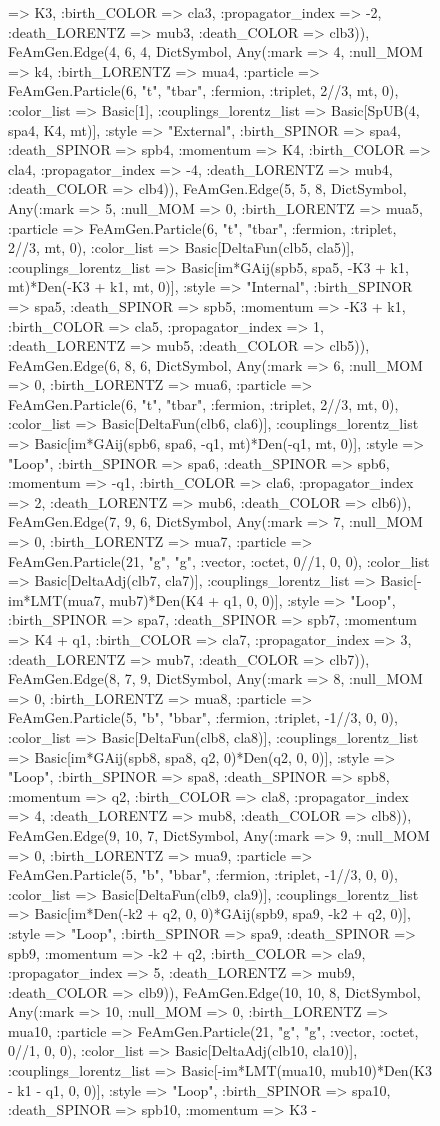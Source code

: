 \documentclass{revtex4}
\begin{document}
\begin{figure}[!htb]
\begin{center}
{=> K3, :birth_COLOR => cla3, :propagator_index => -2, :death_LORENTZ => mub3, :death_COLOR => clb3)), FeAmGen.Edge(4, 6, 4, Dict{Symbol, Any}(:mark => 4, :null_MOM => k4, :birth_LORENTZ => mua4, :particle => FeAmGen.Particle(6, "t", "tbar", :fermion, :triplet, 2//3, mt, 0), :color_list => Basic[1], :couplings_lorentz_list => Basic[SpUB(4, spa4, K4, mt)], :style => "External", :birth_SPINOR => spa4, :death_SPINOR => spb4, :momentum => K4, :birth_COLOR => cla4, :propagator_index => -4, :death_LORENTZ => mub4, :death_COLOR => clb4)), FeAmGen.Edge(5, 5, 8, Dict{Symbol, Any}(:mark => 5, :null_MOM => 0, :birth_LORENTZ => mua5, :particle => FeAmGen.Particle(6, "t", "tbar", :fermion, :triplet, 2//3, mt, 0), :color_list => Basic[DeltaFun(clb5, cla5)], :couplings_lorentz_list => Basic[im*GAij(spb5, spa5, -K3 + k1, mt)*Den(-K3 + k1, mt, 0)], :style => "Internal", :birth_SPINOR => spa5, :death_SPINOR => spb5, :momentum => -K3 + k1, :birth_COLOR => cla5, :propagator_index => 1, :death_LORENTZ => mub5, :death_COLOR => clb5)), FeAmGen.Edge(6, 8, 6, Dict{Symbol, Any}(:mark => 6, :null_MOM => 0, :birth_LORENTZ => mua6, :particle => FeAmGen.Particle(6, "t", "tbar", :fermion, :triplet, 2//3, mt, 0), :color_list => Basic[DeltaFun(clb6, cla6)], :couplings_lorentz_list => Basic[im*GAij(spb6, spa6, -q1, mt)*Den(-q1, mt, 0)], :style => "Loop", :birth_SPINOR => spa6, :death_SPINOR => spb6, :momentum => -q1, :birth_COLOR => cla6, :propagator_index => 2, :death_LORENTZ => mub6, :death_COLOR => clb6)), FeAmGen.Edge(7, 9, 6, Dict{Symbol, Any}(:mark => 7, :null_MOM => 0, :birth_LORENTZ => mua7, :particle => FeAmGen.Particle(21, "g", "g", :vector, :octet, 0//1, 0, 0), :color_list => Basic[DeltaAdj(clb7, cla7)], :couplings_lorentz_list => Basic[-im*LMT(mua7, mub7)*Den(K4 + q1, 0, 0)], :style => "Loop", :birth_SPINOR => spa7, :death_SPINOR => spb7, :momentum => K4 + q1, :birth_COLOR => cla7, :propagator_index => 3, :death_LORENTZ => mub7, :death_COLOR => clb7)), FeAmGen.Edge(8, 7, 9, Dict{Symbol, Any}(:mark => 8, :null_MOM => 0, :birth_LORENTZ => mua8, :particle => FeAmGen.Particle(5, "b", "bbar", :fermion, :triplet, -1//3, 0, 0), :color_list => Basic[DeltaFun(clb8, cla8)], :couplings_lorentz_list => Basic[im*GAij(spb8, spa8, q2, 0)*Den(q2, 0, 0)], :style => "Loop", :birth_SPINOR => spa8, :death_SPINOR => spb8, :momentum => q2, :birth_COLOR => cla8, :propagator_index => 4, :death_LORENTZ => mub8, :death_COLOR => clb8)), FeAmGen.Edge(9, 10, 7, Dict{Symbol, Any}(:mark => 9, :null_MOM => 0, :birth_LORENTZ => mua9, :particle => FeAmGen.Particle(5, "b", "bbar", :fermion, :triplet, -1//3, 0, 0), :color_list => Basic[DeltaFun(clb9, cla9)], :couplings_lorentz_list => Basic[im*Den(-k2 + q2, 0, 0)*GAij(spb9, spa9, -k2 + q2, 0)], :style => "Loop", :birth_SPINOR => spa9, :death_SPINOR => spb9, :momentum => -k2 + q2, :birth_COLOR => cla9, :propagator_index => 5, :death_LORENTZ => mub9, :death_COLOR => clb9)), FeAmGen.Edge(10, 10, 8, Dict{Symbol, Any}(:mark => 10, :null_MOM => 0, :birth_LORENTZ => mua10, :particle => FeAmGen.Particle(21, "g", "g", :vector, :octet, 0//1, 0, 0), :color_list => Basic[DeltaAdj(clb10, cla10)], :couplings_lorentz_list => Basic[-im*LMT(mua10, mub10)*Den(K3 - k1 - q1, 0, 0)], :style => "Loop", :birth_SPINOR => spa10, :death_SPINOR => spb10, :momentum => K3 - }
\end{center}
\end{figure}
\end{document}
